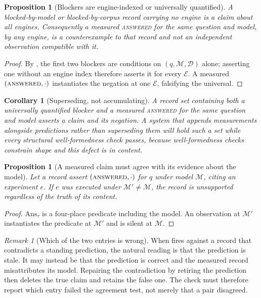 \documentclass[11pt,a4paper]{article}
\theoremstyle{plain}
\newtheorem{proposition}[theorem]{Proposition}
\newtheorem{corollary}[theorem]{Corollary}
\theoremstyle{definition}
\theoremstyle{remark}
\newtheorem{remark}[theorem]{Remark}
\newcommand{\Model}{\mathcal{M}}          %
\newcommand{\Corpus}{\mathcal{D}}         %
\newcommand{\Engine}{\mathcal{E}}         %
\newcommand{\vans}{\textsc{answered}}
\newcommand{\qq}{q}
\begin{document}
\begin{proposition}[Blockers are engine-indexed or universally quantified]
\label{prop:engine-index}
A \textsf{blocked-by-model} or \textsf{blocked-by-corpus} record carrying no
engine is a claim about all engines. Consequently a measured \vans{} for the
same question and model, by any engine, is a counterexample to that record and
not an independent observation compatible with it.
\end{proposition}

\begin{proof}
By , the first two blockers are conditions on
$(\qq,\Model,\Corpus)$ alone; asserting one without an engine index therefore
asserts it for every $\Engine$. A measured $(\vans,\cdot)$ instantiates the
negation at one $\Engine$, falsifying the universal.
\end{proof}

\begin{corollary}[Superseding, not accumulating]
\label{cor:supersede}
A record set containing both a universally quantified blocker and a measured
\vans{} for the same question and model asserts a claim and its negation. A
system that appends measurements alongside predictions rather than superseding
them will hold such a set while every structural well-formedness check passes,
because well-formedness checks constrain shape and this defect is in content.
\end{corollary}

\begin{proposition}[A measured claim must agree with its evidence about the model]
\label{prop:model-agreement}
Let a record assert $(\vans,\cdot)$ for $\qq$ under model $\Model$, citing an
experiment $e$. If $e$ was executed under $\Model' \neq \Model$, the record is
unsupported regardless of the truth of its content.
\end{proposition}

\begin{proof}
$\mathrm{Ans}_\tau$ is a four-place predicate including the model. An
observation at $\Model'$ instantiates the predicate at $\Model'$ and is silent
at $\Model$.
\end{proof}

\begin{remark}[Which of the two entries is wrong]
\label{rem:which-wrong}
When  fires against a record that contradicts a
standing prediction, the natural reading is that the prediction is stale. It
may instead be that the prediction is correct and the measured record
misattributes its model. Repairing the contradiction by retiring the
prediction then deletes the true claim and retains the false one. The check
must therefore report which entry failed the agreement test, not merely that a
pair disagreed.
\end{remark}
\end{document}
